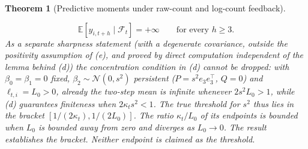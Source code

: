 \documentclass[12pt]{article}
\theoremstyle{plain}
\newtheorem{theorem}{Theorem}
\theoremstyle{definition}
\theoremstyle{remark}
\newcommand{\E}{\mathbb{E}}
\newcommand{\calF}{\mathcal{F}}
\newcommand{\calN}{\mathcal{N}}
\newcommand{\T}{^{\top}}
\begin{document}
\begin{theorem}[Predictive moments under raw-count and log-count feedback]
\begin{enumerate}[label=(\alph*),leftmargin=*]
\[
\E[y_{i,t+h}\mid\calF_t]=+\infty\qquad\text{for every }h\ge3 .
\]
As a separate sharpness statement (with a degenerate covariance, outside the positivity assumption of \textup{(e)}, and proved by direct computation independent of the lemma behind \textup{(d)}) the concentration condition in \textup{(d)} cannot be dropped: with $\beta_0=\beta_1=0$ fixed, $\beta_2\sim\calN(0,s^2)$ persistent \textup{(}$P=s^2e_3e_3\T$, $Q=0$\textup{)} and $\ell_{t,i}=L_0>0$, already the \emph{two}-step mean is infinite whenever $2s^2L_0>1$, while \textup{(d)} guarantees finiteness when $2\kappa_ts^2<1$. The true threshold for $s^2$ thus lies in the bracket $[1/(2\kappa_t),1/(2L_0)]$. The ratio $\kappa_t/L_0$ of its endpoints is bounded when $L_0$ is bounded away from zero and diverges as $L_0\to0$. The result establishes the bracket. Neither endpoint is claimed as the threshold.
\end{enumerate}
\end{theorem}
\end{document}
